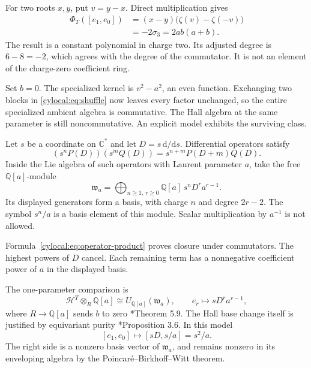 For two roots $x,y$, put $v=y-x$. Direct multiplication gives
\begin{align*}
 \Phi_T([e_1,e_0])
  &=(x-y)\bigl(\zeta(v)-\zeta(-v)\bigr)\\
  &=-2\sigma_3=2ab(a+b).
\end{align*}
The result is a constant polynomial in charge two. Its adjusted
degree is $6-8=-2$, which agrees with the degree of the commutator.
It is not an element of the charge-zero coefficient ring.

Set $b=0$. The specialized kernel is $v^2-a^2$, an even function.
Exchanging two blocks in \eqref{cylocal:eq:shuffle} now leaves every
factor unchanged, so the entire specialized ambient algebra is
commutative. The Hall algebra at the same parameter is still
noncommutative. An explicit model exhibits the surviving class.

Let $s$ be a coordinate on $\mathbb C^*$ and let
$D=s\,\mathrm d/\mathrm ds$. Differential operators satisfy
\begin{equation}\label{cylocal:eq:operator-product}
 (s^nP(D))(s^mQ(D))=s^{n+m}P(D+m)Q(D).
\end{equation}
Inside the Lie algebra of such operators with Laurent parameter
$a$, take the free $\mathbb Q[a]$-module
\begin{equation}\label{cylocal:eq:rees}
 \mathfrak w_a=
 \bigoplus_{n\geq1,\ r\geq0}
       \mathbb Q[a]\,s^nD^r a^{r-1}.
\end{equation}
Its displayed generators form a basis, with charge $n$ and degree
$2r-2$. The symbol $s^n/a$ is a basis
element of this module. Scalar multiplication by $a^{-1}$ is not
allowed.

Formula~\eqref{cylocal:eq:operator-product} proves closure under
commutators. The highest powers of $D$ cancel. Each remaining term
has a nonnegative coefficient power of $a$ in the displayed basis.

The one-parameter comparison is
\begin{equation}\label{cylocal:eq:one-parameter}
 \mathcal H^T\otimes_R\mathbb Q[a]
   \cong U_{\mathbb Q[a]}(\mathfrak w_a),
 \qquad e_r\longmapsto sD^r a^{r-1},
\end{equation}
where $R\to\mathbb Q[a]$ sends $b$ to zero
\cite{cylocal:Davison}*{Theorem 5.9}.
The Hall base change itself is justified by equivariant purity
\cite{cylocal:Davison}*{Proposition 3.6}.
In this model
\begin{equation}\label{cylocal:eq:surviving-commutator}
 [e_1,e_0]\longmapsto[sD,s/a]=s^2/a.
\end{equation}
The right side is a nonzero basis vector of $\mathfrak w_a$, and
remains nonzero in its enveloping algebra by the
Poincar\'e--Birkhoff--Witt theorem.

